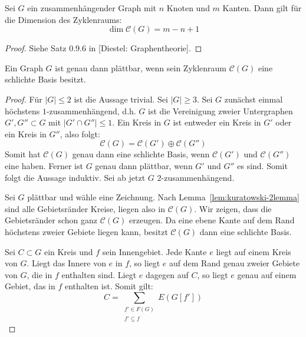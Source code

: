\documentclass[10pt,b5paper]{article}
\begin{document}
\begin{lemma}\label{lem:dimensionsformel}
Sei $G$ ein zusammenhängender Graph mit $n$ Knoten und $m$ Kanten. Dann gilt für die Dimension des Zyklenraums:
\[ \dim \mathcal{C}(G) = m-n+1 \]
\end{lemma}

\begin{proof}
Siehe Satz 0.9.6 in [Diestel: Graphentheorie].
\end{proof}

\begin{theorem}\label{thm:maclane}
Ein Graph $G$ ist genau dann plättbar, wenn sein Zyklenraum $\mathcal{C}(G)$ eine schlichte Basis besitzt.
\end{theorem}

\begin{proof}
Für $|G|\leq 2$ ist die Aussage trivial. Sei $|G|\geq 3$. Sei $G$ zunächst einmal höchstens $1$-zusammenhängend, d.h. $G$ ist die Vereinigung zweier Untergraphen $G',G''\subset G$ mit $|G'\cap G''|\leq 1$. Ein Kreis in $G$ ist entweder ein Kreis in $G'$ oder ein Kreis in $G''$, also folgt:
\[ \mathcal{C}(G) = \mathcal{C}(G')\oplus\mathcal{C}(G'') \]
Somit hat $\mathcal{C}(G)$ genau dann eine schlichte Basis, wenn $\mathcal{C}(G')$ und $\mathcal{C}(G'')$ eine haben. Ferner ist $G$ genau dann plättbar, wenn $G'$ und $G''$ es sind. Somit folgt die Aussage induktiv. Sei ab jetzt $G$ $2$-zusammenhängend. 

Sei $G$ plättbar und wähle eine Zeichnung. Nach Lemma~\ref{lem:kuratowski-2lemma} sind alle Gebietsränder Kreise, liegen also in $\mathcal{C}(G)$. Wir zeigen, dass die Gebietsränder schon ganz $\mathcal{C}(G)$ erzeugen. Da eine ebene Kante auf dem Rand höchstens zweier Gebiete liegen kann, besitzt $\mathcal{C}(G)$ dann eine schlichte Basis. 

Sei $C\subset G$ ein Kreis und $f$ sein Innengebiet. Jede Kante $e$ liegt auf einem Kreis von $G$. Liegt das Innere von $e$ in $f$, so liegt $e$ auf dem Rand genau zweier Gebiete von $G$, die in $f$ enthalten sind. Liegt $e$ dagegen auf $C$, so liegt $e$ genau auf einem Gebiet, das in $f$ enthalten ist. Somit gilt:
\[ C = \sum_{\substack{f'\in F(G)\\ f'\subseteq f}} E(G[f']) \]


\end{proof}
\end{document}
